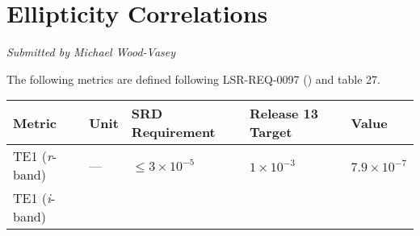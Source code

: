 \documentclass[DM,toc]{lsstdoc}
\begin{document}
\section{Ellipticity Correlations}\label{ellipticity-correlations}

\emph{Submitted by Michael Wood-Vasey}

The following metrics are defined following LSR-REQ-0097
() and
 table 27.

\begin{longtable}[]{@{}lllll@{}}
\toprule
\begin{minipage}[b]{0.13\columnwidth}\raggedright\strut
Metric\strut
\end{minipage} & \begin{minipage}[b]{0.05\columnwidth}\raggedright\strut
Unit\strut
\end{minipage} & \begin{minipage}[b]{0.24\columnwidth}\raggedright\strut
SRD Requirement\strut
\end{minipage} & \begin{minipage}[b]{0.21\columnwidth}\raggedright\strut
Release 13 Target\strut
\end{minipage} & \begin{minipage}[b]{0.22\columnwidth}\raggedright\strut
Value\strut
\end{minipage}\tabularnewline
\midrule
\endhead
\begin{minipage}[t]{0.13\columnwidth}\raggedright\strut
TE1 (\emph{r}-band)\strut
\end{minipage} & \begin{minipage}[t]{0.05\columnwidth}\raggedright\strut
---\strut
\end{minipage} & \begin{minipage}[t]{0.24\columnwidth}\raggedright\strut
\(\leq 3\times 10^{-5}\)\strut
\end{minipage} & \begin{minipage}[t]{0.21\columnwidth}\raggedright\strut
\(1 \times 10^{-3}\)\strut
\end{minipage} & \begin{minipage}[t]{0.22\columnwidth}\raggedright\strut
\(7.9 \times 10^{-7}\)\strut
\end{minipage}\tabularnewline
\begin{minipage}[t]{0.13\columnwidth}\raggedright\strut
TE1 (\emph{i}-band)\strut
\end{minipage} & \begin{minipage}[t]{0.05\columnwidth}\raggedright\strut

\end{minipage}
\end{longtable}
\end{document}
